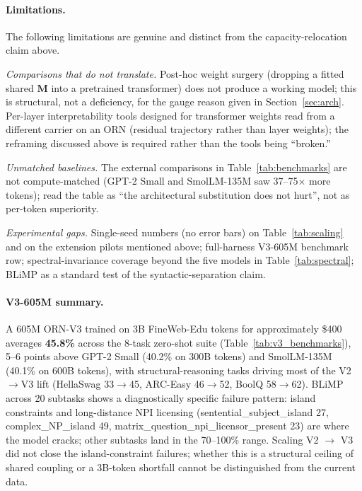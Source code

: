 \documentclass[10pt,twocolumn]{article}
\newcommand{\M}{\mathbf{M}}
\begin{document}
\paragraph{Limitations.}
The following limitations are genuine and distinct from the capacity-relocation claim above.

\textit{Comparisons that do not translate.} Post-hoc weight surgery (dropping a fitted shared $\M$ into a pretrained transformer) does not produce a working model; this is structural, not a deficiency, for the gauge reason given in Section~\ref{sec:arch}. Per-layer interpretability tools designed for transformer weights read from a different carrier on an ORN (residual trajectory rather than layer weights); the reframing discussed above is required rather than the tools being ``broken.''

\textit{Unmatched baselines.} The external comparisons in Table~\ref{tab:benchmarks} are not compute-matched (GPT-2 Small and SmolLM-135M saw 37--75$\times$ more tokens); read the table as ``the architectural substitution does not hurt'', not as per-token superiority.

\textit{Experimental gaps.} Single-seed numbers (no error bars) on Table~\ref{tab:scaling} and on the extension pilots mentioned above; full-harness V3-605M benchmark row; spectral-invariance coverage beyond the five models in Table~\ref{tab:spectral}; BLiMP as a standard test of the syntactic-separation claim.

\paragraph{V3-605M summary.}
A 605M ORN-V3 trained on 3B FineWeb-Edu tokens for approximately \$400 averages \textbf{45.8\%} across the 8-task zero-shot suite (Table~\ref{tab:v3_benchmarks}), 5--6 points above GPT-2 Small (40.2\% on 300B tokens) and SmolLM-135M (40.1\% on 600B tokens), with structural-reasoning tasks driving most of the V2$\to$V3 lift (HellaSwag 33$\to$45, ARC-Easy 46$\to$52, BoolQ 58$\to$62). BLiMP across 20 subtasks shows a diagnostically specific failure pattern: island constraints and long-distance NPI licensing (sentential\_subject\_island 27, complex\_NP\_island 49, matrix\_question\_npi\_licensor\_present 23) are where the model cracks; other subtasks land in the 70--100\% range. Scaling V2 $\to$ V3 did not close the island-constraint failures; whether this is a structural ceiling of shared coupling or a 3B-token shortfall cannot be distinguished from the current data.
\end{document}
